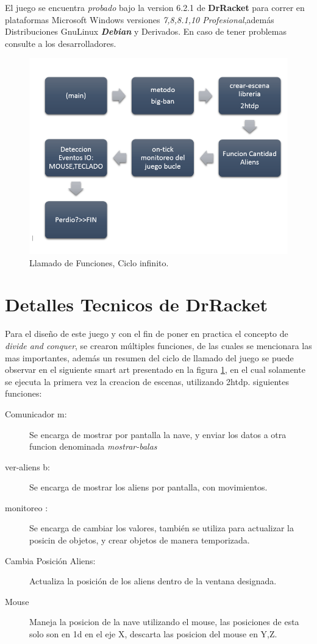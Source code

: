 \documentclass[a4paper]{article} %
\begin{document}
El juego se encuentra \emph{probado} bajo la version 6.2.1 de \textbf{DrRacket} para correr en plataformas Microsoft Windows versiones \textit{ 7,8,8.1,10 Profesional},además  Distribuciones Gnu\/Linux \textbf{\textit{Debian}} y Derivados.
En caso de tener problemas consulte a los desarrolladores.
\begin{figure}
  \centering
    \includegraphics[scale=0.6]{images/smart}
  \caption{Llamado de Funciones, Ciclo infinito.}
  \label{fig:smart}
\end{figure}

\newpage
\section{Detalles Tecnicos de  DrRacket \label{Funciones}}

Para el diseño de este juego y con el fin de poner en practica el concepto de \textit{divide and conquer}, se crearon múltiples funciones, de las cuales se mencionara las mas importantes, además un resumen del ciclo de llamado del juego se puede observar en el siguiente smart art presentado en la figura \ref{fig:smart}, en el cual solamente se ejecuta la primera vez la creacion de escenas, utilizando 2htdp.
siguientes funciones:
\begin{description}
    \item[Comunicador m:] Se encarga de mostrar por pantalla la nave, y enviar los datos a otra funcion denominada \textit{mostrar-balas}
    \item[ver-aliens b:] Se encarga de mostrar los aliens por pantalla, con movimientos.
    \item[monitoreo :]Se encarga de cambiar los valores, también se utiliza para actualizar la posicin de objetos, y crear objetos de manera temporizada. 
    \item[Cambia Posición Aliens:]Actualiza la posición de los aliens dentro de la ventana designada.	
    \item[Mouse] Maneja la posicion de la nave utilizando el mouse, las posiciones de esta solo son en 1d 
        en el eje X, descarta las posicion del mouse en Y,Z.
        
\end{description}
\end{document}
